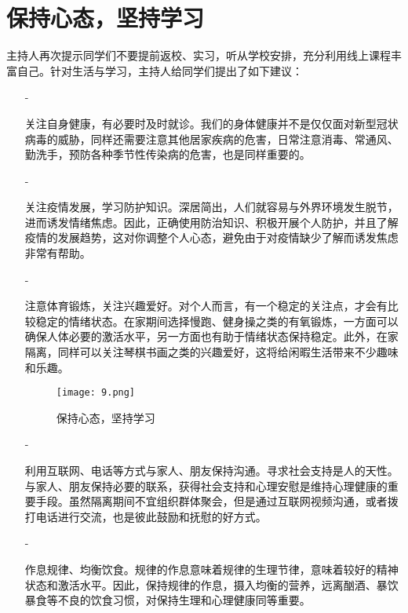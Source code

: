 \documentclass[UTF8]{ctexart}
\begin{document}
	\title{\vspace{2em}}
	\section*{保持心态，坚持学习}
	\title{\vspace{1em}}
	\par{主持人再次提示同学们不要提前返校、实习，听从学校安排，充分利用线上课程丰富自己。针对生活与学习，主持人给同学们提出了如下建议：}
	\begin{itemize}
		\item[-]\par{关注自身健康，有必要时及时就诊。我们的身体健康并不是仅仅面对新型冠状病毒的威胁，同样还需要注意其他居家疾病的危害，日常注意消毒、常通风、勤洗手，预防各种季节性传染病的危害，也是同样重要的。}
		\item[-]\par{关注疫情发展，学习防护知识。深居简出，人们就容易与外界环境发生脱节，进而诱发情绪焦虑。因此，正确使用防治知识、积极开展个人防护，并且了解疫情的发展趋势，这对你调整个人心态，避免由于对疫情缺少了解而诱发焦虑非常有帮助。}
		\item[-]\par{注意体育锻炼，关注兴趣爱好。对个人而言，有一个稳定的关注点，才会有比较稳定的情绪状态。在家期间选择慢跑、健身操之类的有氧锻炼，一方面可以确保人体必要的激活水平，另一方面也有助于情绪状态保持稳定。此外，在家隔离，同样可以关注琴棋书画之类的兴趣爱好，这将给闲暇生活带来不少趣味和乐趣。}
		\title{\vspace{1em}}
		\begin{figure}[H]
			\centering
			\begin{center}{}
				\begin{minipage}[t]{4in}
					\texttt{[image: 9.png]}
					\caption*{\kaishu 保持心态，坚持学习}
				\end{minipage}
			\end{center}
		\end{figure}
		\item[-]\par{利用互联网、电话等方式与家人、朋友保持沟通。寻求社会支持是人的天性。与家人、朋友保持必要的联系，获得社会支持和心理安慰是维持心理健康的重要手段。虽然隔离期间不宜组织群体聚会，但是通过互联网视频沟通，或者拨打电话进行交流，也是彼此鼓励和抚慰的好方式。}
		\item[-]\par{作息规律、均衡饮食。规律的作息意味着规律的生理节律，意味着较好的精神状态和激活水平。因此，保持规律的作息，摄入均衡的营养，远离酗酒、暴饮暴食等不良的饮食习惯，对保持生理和心理健康同等重要。}

\end{itemize}
\end{document}
